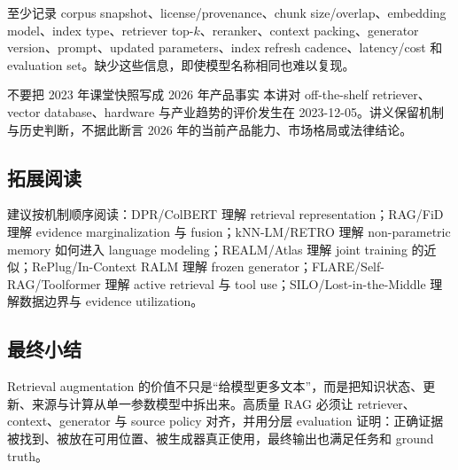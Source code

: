 至少记录 corpus snapshot、license/provenance、chunk size/overlap、embedding model、index type、retriever top-$k$、reranker、context packing、generator version、prompt、updated parameters、index refresh cadence、latency/cost 和 evaluation set。缺少这些信息，即使模型名称相同也难以复现。

\begin{warningbox}{不要把 2023 年课堂快照写成 2026 年产品事实}
本讲对 off-the-shelf retriever、vector database、hardware 与产业趋势的评价发生在 2023-12-05。讲义保留机制与历史判断，不据此断言 2026 年的当前产品能力、市场格局或法律结论。
\end{warningbox}

\subsection{拓展阅读}

建议按机制顺序阅读：DPR/ColBERT 理解 retrieval representation；RAG/FiD 理解 evidence marginalization 与 fusion；kNN-LM/RETRO 理解 non-parametric memory 如何进入 language modeling；REALM/Atlas 理解 joint training 的近似；RePlug/In-Context RALM 理解 frozen generator；FLARE/Self-RAG/Toolformer 理解 active retrieval 与 tool use；SILO/Lost-in-the-Middle 理解数据边界与 evidence utilization。

\subsection{最终小结}

Retrieval augmentation 的价值不只是“给模型更多文本”，而是把知识状态、更新、来源与计算从单一参数模型中拆出来。高质量 RAG 必须让 retriever、context、generator 与 source policy 对齐，并用分层 evaluation 证明：正确证据被找到、被放在可用位置、被生成器真正使用，最终输出也满足任务和 ground truth。


